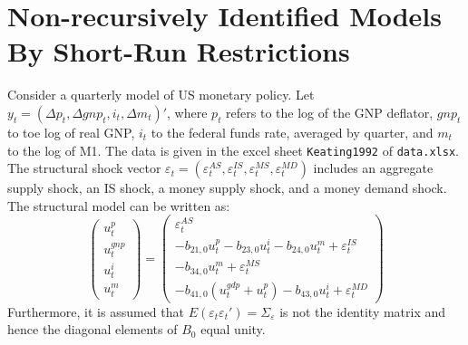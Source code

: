 \documentclass[a4paper]{scrartcl}
\begin{document}
    \section{Non-recursively Identified Models By Short-Run Restrictions}
    Consider a quarterly model of US monetary policy. Let $y_t=(\Delta p_t, \Delta gnp_t, i_t, \Delta m_t)'$, where $p_t$ refers to the log of the GNP deflator, $gnp_t$ to toe log of real GNP, $i_t$ to the federal funds rate, averaged by quarter, and $m_t$ to the log of M1. 
    The data is given in the excel sheet \texttt{Keating1992} of \texttt{data.xlsx}. The structural shock vector $\varepsilon_t = (\varepsilon_t^{AS},\varepsilon_t^{IS},\varepsilon_t^{MS},\varepsilon_t^{MD})$ includes an aggregate supply shock, an IS shock, a money supply shock, and a money demand shock. The structural model can be written as:
    $$\begin{pmatrix}
            u_t^p \\u_t^{gnp}\\u_t^{i}\\u_t^m
        \end{pmatrix} =
        \begin{pmatrix}
            \varepsilon_{t}^{AS}                                                 \\
            -b_{21,0}u_t^p - b_{23,0} u_t^i- b_{24,0}u_t^m +\varepsilon_{t}^{IS} \\
            -b_{34,0}u_t^m + \varepsilon_{t}^{MS}                                \\
            -b_{41,0}(u_t^{gdp}+u_t^p)-b_{43,0}u_t^i +\varepsilon_{t}^{MD}
        \end{pmatrix}$$
    Furthermore, it is assumed that $E(\varepsilon_t \varepsilon_t')=\Sigma_\varepsilon$ is not the identity matrix and hence the diagonal elements of $B_0$ equal unity.
\end{document}

